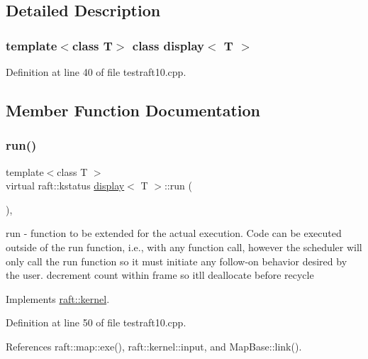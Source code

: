 \subsection{Detailed Description}
\subsubsection*{template$<$class T$>$\newline
class display$<$ T $>$}



Definition at line 40 of file testraft10.\+cpp.



\subsection{Member Function Documentation}
\hypertarget{classdisplay_a8652ca329ee5d1650e183b17f7299b51}{}\label{classdisplay_a8652ca329ee5d1650e183b17f7299b51} 
\subsubsection{\texorpdfstring{run()}{run()}}
{\footnotesize\ttfamily template$<$class T $>$ \\
virtual raft\+::kstatus \hyperlink{classdisplay}{display}$<$ T $>$\+::run (\begin{DoxyParamCaption}{ }\end{DoxyParamCaption})\hspace{0.3cm}{\ttfamily [inline]}, {\ttfamily [virtual]}}

run -\/ function to be extended for the actual execution. Code can be executed outside of the run function, i.\+e., with any function call, however the scheduler will only call the run function so it must initiate any follow-\/on behavior desired by the user. decrement count within frame so it\textquotesingle{}ll deallocate before recycle 

Implements \hyperlink{classraft_1_1kernel_a05094286d7577360fb1b91c91fc05901}{raft\+::kernel}.



Definition at line 50 of file testraft10.\+cpp.



References raft\+::map\+::exe(), raft\+::kernel\+::input, and Map\+Base\+::link().


